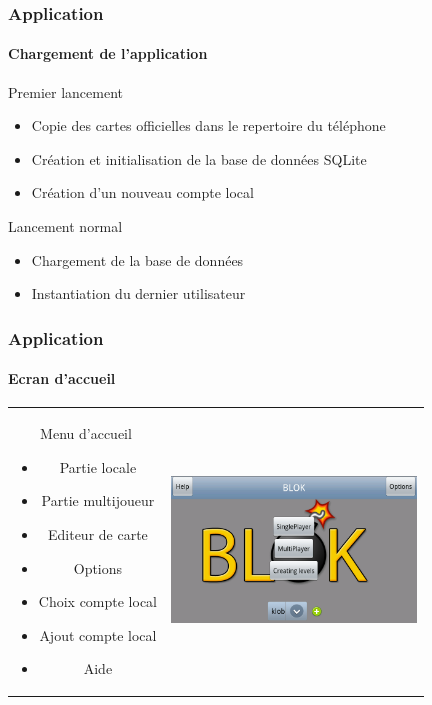 	\begin{frame}
	\frametitle{Application}
	\framesubtitle{Chargement de l'application}
		\begin{block}{Premier lancement}
			\begin{itemize}
			 	\item Copie des cartes officielles dans le repertoire du téléphone 
				\item Création et initialisation de la base de données SQLite
				\item Création d'un nouveau compte local
			\end{itemize}
		\end{block}
				
		\begin{block}{Lancement normal}
			\begin{itemize}
				\item Chargement de la base de données 
				\item Instantiation du dernier utilisateur
			\end{itemize}
		\end{block}
	
	\end{frame}
	
	
	\begin{frame}
	\frametitle{Application}
	\framesubtitle{Ecran d'accueil}
		\begin{center}
		\begin{tabular}{cc}
			\begin{minipage}{4cm}
		
				Menu d'accueil
				\begin{itemize}
					\item Partie locale
					\item Partie multijoueur
					\item Editeur de carte
					\item Options
					\item Choix compte local
					\item Ajout compte local
					\item Aide
				\end{itemize}
			\end{minipage}  &		
			\begin{minipage}{8cm}
				\includegraphics[width=6.5cm]{img/2.png} 
			\end{minipage}\\
		\end{tabular}
		\end{center}
	
	\end{frame}
	
